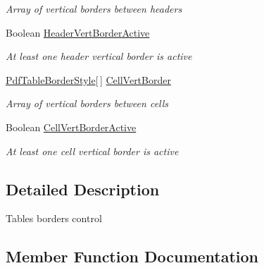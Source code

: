 \begin{DoxyCompactItemize}
\begin{DoxyCompactList}\small\item\em Array of vertical borders between headers \end{DoxyCompactList}\item 
Boolean \hyperlink{class_pdf_file_writer_1_1_pdf_table_border_aef93e4a5c88ed9c159c68e9d326d5648}{Header\+Vert\+Border\+Active}
\begin{DoxyCompactList}\small\item\em At least one header vertical border is active \end{DoxyCompactList}\item 
\hyperlink{class_pdf_file_writer_1_1_pdf_table_border_style}{Pdf\+Table\+Border\+Style}\mbox{[}$\,$\mbox{]} \hyperlink{class_pdf_file_writer_1_1_pdf_table_border_a99c9500b6f848de866e4455d6201c1cb}{Cell\+Vert\+Border}
\begin{DoxyCompactList}\small\item\em Array of vertical borders between cells \end{DoxyCompactList}\item 
Boolean \hyperlink{class_pdf_file_writer_1_1_pdf_table_border_a04806358015eba8554e79a058e316741}{Cell\+Vert\+Border\+Active}
\begin{DoxyCompactList}\small\item\em At least one cell vertical border is active \end{DoxyCompactList}\end{DoxyCompactItemize}


\subsection{Detailed Description}
Table\textquotesingle{}s borders control 



\subsection{Member Function Documentation}
